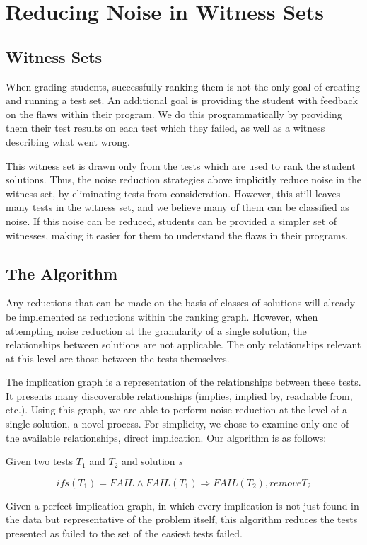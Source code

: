 \documentclass[11pt,twoside]{article}
\newcommand\fail{\mathit{FAIL}}
\theoremstyle{definition}
\begin{document}
\section{Reducing Noise in Witness Sets}
\subsection{Witness Sets}
When grading students, successfully ranking them is not the only goal of creating and running a test set. An additional goal is providing the student with feedback on the flaws within their program. We do this programmatically by providing them their test results on each test which they failed, as well as a witness describing what went wrong.

This witness set is drawn only from the tests which are used to rank the student solutions. Thus, the noise reduction strategies above implicitly reduce noise in the witness set, by eliminating tests from consideration. However, this still leaves many tests in the witness set, and we believe many of them can be classified as noise. If this noise can be reduced, students can be provided a simpler set of witnesses, making it easier for them to understand the flaws in their programs.

\subsection{The Algorithm}
Any reductions that can be made on the basis of classes of solutions will already be implemented as reductions within the ranking graph. However, when attempting noise reduction at the granularity of a single solution, the relationships between solutions are not applicable. The only relationships relevant at this level  are those between the tests themselves.

The implication graph is a representation of the relationships between these tests. It presents many discoverable relationships (implies, implied by, reachable from, etc.). Using this graph, we are able to perform noise reduction at the level of a single solution, a novel process. For simplicity, we chose to examine only one of the available relationships, direct implication. Our algorithm is as follows:

\centerline{Given two tests $T_1$ and $T_2$ and solution $s$}
$$if s(T_1) = \fail \wedge \fail(T_1) \Rightarrow \fail(T_2), remove T_2$$

Given a perfect implication graph, in which every implication is not just found in the data but representative of the problem itself, this algorithm reduces the tests presented as  failed to the set of the easiest tests failed. 
\end{document}
